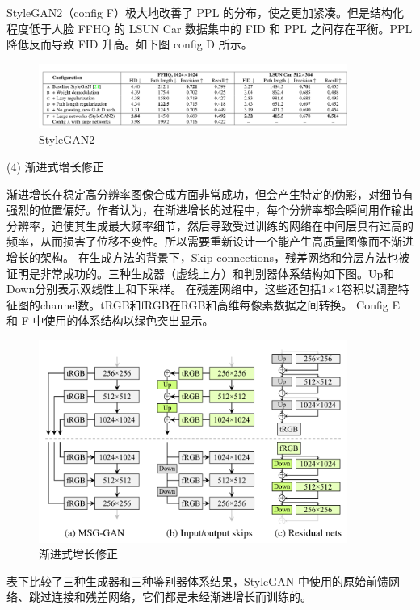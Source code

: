 StyleGAN2（config F）极大地改善了 PPL 的分布，使之更加紧凑。但是结构化程度低于人脸 FFHQ 的 LSUN Car 数据集中的 FID 和 PPL 之间存在平衡。PPL 降低反而导致 FID 升高。如下图 config D 所示。

\begin{figure}[htb]
\centering 
\includegraphics[width=0.9\textwidth]{img/m2t15.png} 
\caption{StyleGAN2}
\label{Test}
\end{figure}

(4) 渐进式增长修正

渐进增长在稳定高分辨率图像合成方面非常成功，但会产生特定的伪影，对细节有强烈的位置偏好。作者认为，在渐进增长的过程中，每个分辨率都会瞬间用作输出分辨率，迫使其生成最大频率细节，然后导致受过训练的网络在中间层具有过高的频率，从而损害了位移不变性。所以需要重新设计一个能产生高质量图像而不渐进增长的架构。 在生成方法的背景下，Skip connections，残差网络和分层方法也被证明是非常成功的。三种生成器（虚线上方）和判别器体系结构如下图。Up和Down分别表示双线性上和下采样。 在残差网络中，这些还包括1×1卷积以调整特征图的channel数。tRGB和fRGB在RGB和高维每像素数据之间转换。 Config E 和 F 中使用的体系结构以绿色突出显示。

\begin{figure}[htb]
\centering 
\includegraphics[width=0.9\textwidth]{img/m2t16.png} 
\caption{渐进式增长修正}
\label{Test}
\end{figure}

表下比较了三种生成器和三种鉴别器体系结果，StyleGAN 中使用的原始前馈网络、跳过连接和残差网络，它们都是未经渐进增长而训练的。

